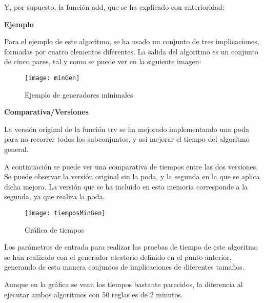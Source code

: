     

    Y, por supuesto, la funci\'on add, que se ha explicado con anterioridad:

    

    \bigskip
    \textbf{Ejemplo}

    Para el ejemplo de este algoritmo, se ha usado un conjunto de tres implicaciones, formadas por cuatro elementos diferentes.
    La salida del algoritmo es un conjunto de cinco pares, tal y como se puede ver en la siguiente imagen:

    \begin{figure}[H]
        \centering
        \texttt{[image: minGen]}
        \caption{Ejemplo de generadores minimales}
        \label{fig:minGen}
    \end{figure}

    

    \bigskip
    \textbf{Comparativa/Versiones}

    La versi\'on original de la funci\'on trv se ha mejorado implementando una poda para no recorrer todos los subconjuntos, y as\'i 
    mejorar el tiempo del algoritmo general.

    A continuaci\'on se puede ver una comparativa de tiempos entre las dos versiones. Se puede observar la versi\'on original sin la poda, y 
    la segunda en la que se aplica dicha mejora. La versi\'on que se ha incluido en esta memoria corresponde a la segunda, ya que 
    realiza la poda.

    \begin{figure}[H]
        \centering
        \texttt{[image: tiemposMinGen]}
        \caption{Gr\'afica de tiempos}
        \label{fig:tiemposMinGen}
    \end{figure}


    Los par\'ametros de entrada para realizar las pruebas de tiempo de este algoritmo se han realizado con el generador aleatorio definido en 
    el punto anterior, generando de esta manera conjuntos de implicaciones de diferentes tama\~nos.

    Aunque en la gr\'afica se vean los tiempos bastante parecidos, la diferencia al ejecutar ambos algoritmos con 50 reglas es de 2 minutos.